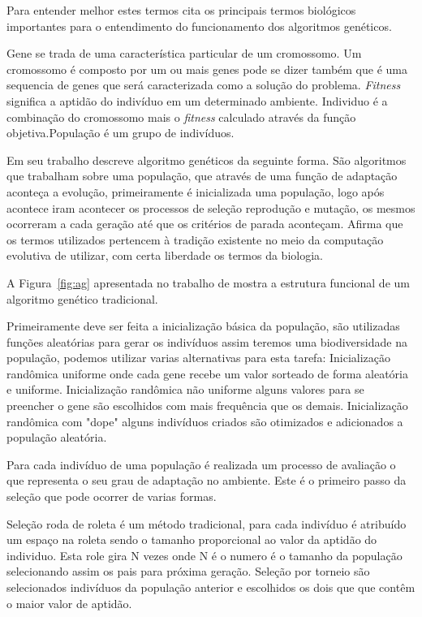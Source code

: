 Para entender melhor estes termos \cite{mitchell1998introduction} cita os principais termos biológicos importantes para o entendimento do funcionamento dos algoritmos genéticos.\par
Gene se trada de uma característica particular de um cromossomo. Um cromossomo é composto por um ou mais genes pode se dizer também que é uma sequencia de genes que será caracterizada como a solução do problema. \textit{Fitness} significa a aptidão do indivíduo em um determinado ambiente. Individuo é a combinação do cromossomo mais o \textit{fitness} calculado através da função objetiva.População é um grupo de indivíduos.\par

Em seu trabalho \cite{lucas2000algoritmos} descreve algoritmo genéticos da seguinte forma. São algoritmos que trabalham sobre uma população, que através de uma função de adaptação aconteça a evolução, primeiramente é inicializada uma população, logo após acontece iram acontecer os processos de seleção reprodução e mutação, os mesmos ocorreram a cada geração até que os critérios de parada aconteçam. Afirma que os termos utilizados pertencem à tradição existente no meio da computação evolutiva de utilizar, com certa liberdade os termos da biologia.

A Figura~\ref{fig:ag} apresentada no trabalho de \cite{lucas2000algoritmos} mostra a estrutura funcional de um algoritmo genético tradicional.\par
Primeiramente deve ser feita a inicialização básica da população, são utilizadas funções aleatórias para gerar os indivíduos assim teremos uma biodiversidade na população, podemos utilizar varias alternativas para esta tarefa: Inicialização randômica uniforme onde cada gene recebe um valor sorteado de forma aleatória e uniforme. Inicialização randômica não uniforme alguns valores para se preencher o gene são escolhidos com mais frequência que os demais. Inicialização randômica com "dope" alguns indivíduos criados são otimizados e adicionados a população aleatória.

Para cada indivíduo de uma população é realizada um processo de avaliação o que representa o seu grau de adaptação no ambiente. Este é o primeiro passo da seleção que pode ocorrer de varias formas.\par

Seleção roda de roleta é um método tradicional, para cada indivíduo é atribuído um espaço na roleta sendo o tamanho proporcional ao valor da aptidão do individuo. Esta role gira N vezes onde N é o numero é o tamanho da população selecionando assim os pais para próxima geração. Seleção por torneio são selecionados indivíduos da população anterior e escolhidos os dois que que contêm o maior valor de aptidão.\par

